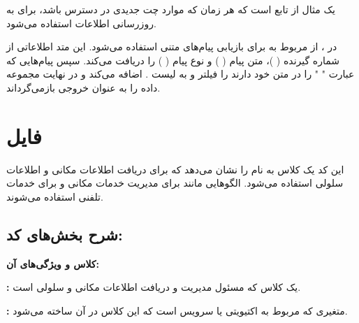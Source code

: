 \documentclass{report}
\begin{document}
 یک مثال از تابع
است که هر زمان که موارد چت جدیدی در دسترس باشد، برای به روزرسانی اطلاعات استفاده می‌شود.

در
 ، از 
  مربوط به 
   برای بازیابی پیام‌های متنی استفاده می‌شود. این متد اطلاعاتی از شماره گیرنده 
   (
   )، متن پیام (
   ) 
   و نوع پیام (
   ) را دریافت می‌کند. سپس پیام‌هایی که عبارت "
   " را در متن خود دارند را فیلتر و به لیست
   .
    اضافه می‌کند و در نهایت مجموعه داده را به عنوان خروجی بازمی‌گرداند.
    
\section{فایل
}

این کد یک کلاس به نام
 را نشان می‌دهد که برای دریافت اطلاعات مکانی و اطلاعات سلولی استفاده می‌شود. الگوهایی مانند
  برای مدیریت خدمات مکانی و
    برای خدمات تلفنی استفاده می‌شوند.

\subsection{شرح بخش‌های کد:}
\textbf{کلاس و ویژگی‌های آن:}

{\textbf{:}} یک کلاس که مسئول مدیریت و دریافت اطلاعات مکانی و سلولی است.


{\textbf{:}} متغیری که مربوط به 
 اکتیویتی یا سرویس است که این کلاس در آن ساخته می‌شود.
 
\end{document}
